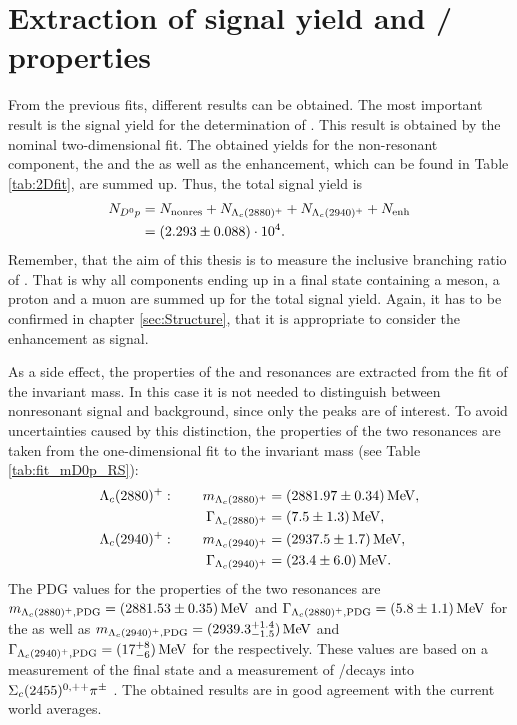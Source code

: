 \section{Extraction of \LbToDpmunuX signal yield and \LcResI / \LcResII properties}
\label{sec:Signalyield_D0p}
From the previous fits, different results can be obtained. 
The most important result is the \LbToDpmunuX signal yield \NDp for the determination of \R.
This result is obtained by the nominal two-dimensional fit.
The obtained yields for the non-resonant component, the \LcResI and the \LcResII as well as the enhancement, which can be found in Table \ref{tab:2Dfit}, are summed up.
Thus, the total \LbToDpmunuX signal yield is
\begin{align*}
    N_{{{D}^0}{p}} &= N_{\text{nonres}} + N_{{\Lambda}_{c}(2880)^+} + N_{{\Lambda}_{c}(2940)^+} + N_{\text{enh}} \\
         &= (2.293 \pm 0.088)\cdot 10^{4}. 
\end{align*}
Remember, that the aim of this thesis is to measure the inclusive branching ratio of \LbToDpmunuX.
That is why all components ending up in a final state containing a \Dz meson, a proton and a muon are summed up for the total signal yield.
Again, it has to be confirmed in chapter \ref{sec:Structure}, that it is appropriate to consider the enhancement as signal.

As a side effect, the properties of the \LcResI and \LcResII resonances are extracted from the fit of the invariant \Dz\proton mass.
In this case it is not needed to distinguish between nonresonant signal and background, since only the peaks are of interest. 
To avoid uncertainties caused by this distinction, the properties of the two resonances are taken from the one-dimensional fit to the invariant \Dz\proton mass (see Table \ref{tab:fit_mD0p_RS}):
\begin{align*}
    {\ensuremath{\Lambda}}_{c}(2880)^+: \qquad  m_{{\Lambda}_{c}(2880)^+}       &= (2881.97 \pm 0.34) \mathrm{\,Me\kern -0.1em V}, \\
                     \Gamma_{{\Lambda}_{c}(2880)^+}  &= (7.5 \pm 1.3) \mathrm{\,Me\kern -0.1em V}, \\
    {\Lambda}_{c}(2940)^+: \qquad m_{{\Lambda}_{c}(2940)^+}      &= (2937.5 \pm 1.7) \mathrm{\,Me\kern -0.1em V}, \\
                     \Gamma_{{\Lambda}_{c}(2940)^+} &= (23.4 \pm 6.0) \mathrm{\,Me\kern -0.1em V}.
\end{align*}
The PDG values for the properties of the two resonances are $m_{{\Lambda}_{c}(2880)^+, \text{PDG}} = (2881.53 \pm 0.35)\mathrm{\,Me\kern -0.1em V}$ and $\Gamma_{{\Lambda}_{c}(2880)^+, \text{PDG}} = (5.8 \pm 1.1)\mathrm{\,Me\kern -0.1em V}$ for the \LcResI as well as $m_{{\Lambda}_{c}(2940)^+, \text{PDG}} = (2939.3^{+1.4}_{-1.5})\mathrm{\,Me\kern -0.1em V}$ and $\Gamma_{{\Lambda}_{c}(2940)^+, \text{PDG}} = (17^{+8}_{-6})\mathrm{\,Me\kern -0.1em V}$ for the \LcResII respectively.
These values are based on a \babar measurement of the \Dz\proton final state and a \belle measurement of \LcResI/\LcResII decays into $\Sigma_{c}(2455)^{0,++}{{\pi}^\pm}$ \cite{Belle_LcRes}.
The obtained results are in good agreement with the current world averages.


